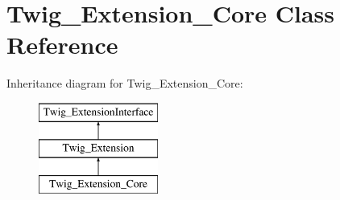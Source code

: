 \hypertarget{class_twig___extension___core}{}\section{Twig\+\_\+\+Extension\+\_\+\+Core Class Reference}
\label{class_twig___extension___core}
Inheritance diagram for Twig\+\_\+\+Extension\+\_\+\+Core\+:\begin{figure}[H]
\begin{center}
\leavevmode
\includegraphics[height=3.000000cm]{class_twig___extension___core}
\end{center}
\end{figure}
